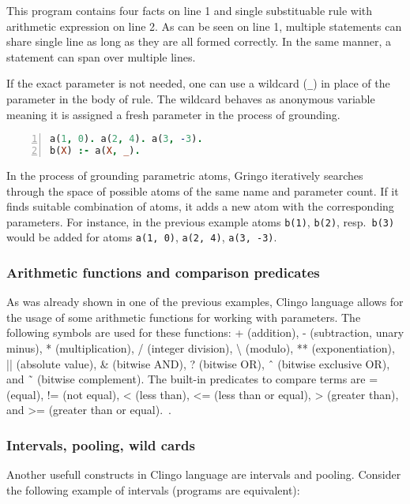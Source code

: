 \documentclass[
    digital,
    color,
    oneside,
    sansbold,
    lot,
    nolof
]{fithesis}
\begin{document}
This program contains four facts on line 1 and single substituable rule with
arithmetic expression on line 2.
As can be seen on line 1, multiple statements can share single line as long as
they are all formed correctly. In the same manner, a statement can span over
multiple lines.

If the exact parameter is not needed, one can use a wildcard (\texttt{\_}) in place of
the parameter in the body of rule. The wildcard behaves as anonymous variable
meaning it is assigned a fresh parameter in the process of grounding.
\begin{lstlisting}[language=prolog, numbers=left, countblanklines=false]
a(1, 0). a(2, 4). a(3, -3).
b(X) :- a(X, _).
\end{lstlisting}

In the process of grounding parametric atoms, Gringo iteratively searches
through the space of possible atoms of the same name and parameter count.
If it finds suitable combination of atoms, it adds a new atom with the
corresponding parameters. For instance, in the previous example atoms
\texttt{b(1)}, \texttt{b(2)}, resp.\ \texttt{b(3)} would be added for
atoms \texttt{a(1, 0)}, \texttt{a(2, 4)}, \texttt{a(3, -3)}.

\subsubsection{Arithmetic functions and comparison predicates}

As was already shown in one of the previous examples, Clingo language allows
for the usage of some arithmetic functions for working with parameters.
The following symbols are used for
these functions: + (addition), - (subtraction, unary minus), * (multiplication), /  %
(integer division), \textbackslash{} (modulo), ** (exponentiation), || (absolute value), \& (bitwise
AND), ? (bitwise OR), ˆ (bitwise exclusive OR), and ˜ (bitwise complement).  %
The built-in predicates to compare terms are = (equal), !=  %
(not equal), < (less than), <= (less than or equal), > (greater than), and >= (greater
than or equal).~\cite{gebser2019potassco}.  

\subsubsection{Intervals, pooling, wild cards}

Another usefull constructs in Clingo language are intervals and pooling.
Consider the following example of intervals (programs are equivalent):
\end{document}
